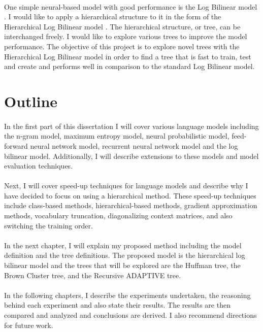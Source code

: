 \paragraph{}
One simple neural-based model with good performance is the Log Bilinear model \cite{MnihHinton2007}. I would like to apply a hierarchical structure to it in the form of the Hierarchical Log Bilinear model \cite{MnihHinton2009}. The hierarchical structure, or tree, can be interchanged freely. I would like to explore various trees to improve the model performance. The objective of this project is to explore novel trees with the Hierarchical Log Bilinear model in order to find a tree that is fast to train, test and create and performs well in comparison to the standard Log Bilinear model.

\section{Outline}
\paragraph{}
In the first part of this dissertation I will cover various language models including the n-gram model, maximum entropy model, neural probabilistic model, feed-forward neural network model, recurrent neural network model and the log bilinear model. Additionally, I will describe extensions to these models and model evaluation techniques.

\paragraph{}
Next, I will cover speed-up techniques for language models and describe why I have decided to focus on using a hierarchical method. These speed-up techniques include class-based methods, hierarchical-based methods, gradient approximation methods, vocabulary truncation, diagonalizing context matrices, and also switching the training order.

\paragraph{}
In the next chapter, I will explain my proposed method including the model definition and the tree definitions. The proposed model is the hierarchical log bilinear model and the trees that will be explored are the Huffman tree, the Brown Cluster tree, and the Recursive ADAPTIVE tree.

\paragraph{}
In the following chapters, I describe the experiments undertaken, the reasoning behind each experiment and also state their results. The results are then compared and analyzed and conclusions are derived. I also recommend directions for future work.

